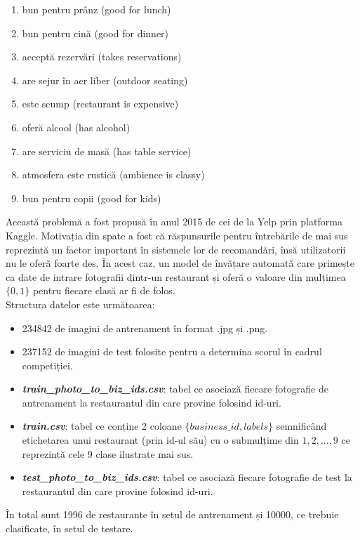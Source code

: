 \documentclass[11pt]{article}
\begin{document}
\begin{enumerate}
\item bun pentru prânz (good for lunch)
\item bun pentru cină (good for dinner)
\item acceptă rezervări (takes reservations)
\item are sejur în aer liber (outdoor seating)
\item este scump (restaurant is expensive)
\item oferă alcool (has alcohol)
\item are serviciu de masă (has table service)
\item atmosfera este rustică (ambience is classy)
\item bun pentru copii (good for kids)
\end{enumerate}

Această problemă a fost propusă în anul 2015 de cei de la Yelp prin platforma Kaggle. Motivația din spate a fost că răspunsurile pentru întrebările de mai sus reprezintă un factor important în sistemele lor de recomandări, însă utilizatorii nu le oferă foarte des. În acest caz, un model de învățare automată care primește ca date de intrare fotografii dintr-un restaurant și oferă o valoare din mulțimea $\{0, 1\}$ pentru fiecare clasă ar fi de folos. \\

Structura datelor este următoarea:

\begin{itemize}
\item 234842 de imagini de antrenament în format .jpg și .png.
\item 237152 de imagini de test folosite pentru a determina scorul în cadrul competiției.
\item \textit{\textbf{train\_photo\_to\_biz\_ids.csv}}: tabel ce asociază fiecare fotografie de antrenament la restaurantul din care provine folosind id-uri.
\item \textit{\textbf{train.csv}}: tabel ce conține 2 coloane $\{business\_id, labels\}$ semnificând etichetarea unui restaurant (prin id-ul său) cu o submulțime din ${1,2,...,9}$ ce reprezintă cele 9 clase ilustrate mai sus.
\item \textit{\textbf{test\_photo\_to\_biz\_ids.csv}}: tabel ce asociază fiecare fotografie de test la restaurantul din care provine folosind id-uri.
\end{itemize}

În total sunt 1996 de restaurante în setul de antrenament și 10000, ce trebuie clasificate, în setul de testare.
\end{document}
